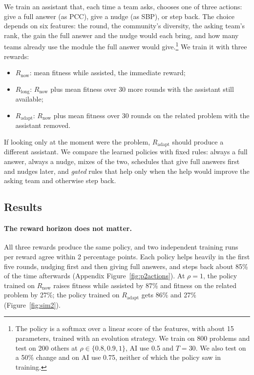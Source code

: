 \documentclass[11pt]{article}
\begin{document}
We train an assistant that, each time a team asks, chooses one of three actions: give a full answer (as PCC), give a nudge (as SBP), or step back. The choice depends on six features: the round, the community's diversity, the asking team's rank, the gain the full answer and the nudge would each bring, and how many teams already use the module the full answer would give.\footnote{The policy is a softmax over a linear score of the features, with about 15 parameters, trained with an evolution strategy. We train on 800 problems and test on 200 others at $\rho \in \{0.8, 0.9, 1\}$, AI use 0.5 and $T=30$. We also test on a 50\% change and on AI use 0.75, neither of which the policy saw in training.} We train it with three rewards:
\begin{itemize}
\item $R_{\text{now}}$: mean fitness while assisted, the immediate reward;
\item $R_{\text{long}}$: $R_{\text{now}}$ plus mean fitness over 30 more rounds with the assistant still available;
\item $R_{\text{adapt}}$: $R_{\text{now}}$ plus mean fitness over 30 rounds on the related problem with the assistant removed.
\end{itemize}
If looking only at the moment were the problem, $R_{\text{adapt}}$ should produce a different assistant. We compare the learned policies with fixed rules: always a full answer, always a nudge, mixes of the two, schedules that give full answers first and nudges later, and \emph{gated} rules that help only when the help would improve the asking team and otherwise step back.

\subsection{Results}

\paragraph{The reward horizon does not matter.} All three rewards produce the same policy, and two independent training runs per reward agree within 2 percentage points. Each policy helps heavily in the first five rounds, nudging first and then giving full answers, and steps back about 85\% of the time afterwards (Appendix Figure~\ref{fig:p2actions}). At $\rho=1$, the policy trained on $R_{\text{now}}$ raises fitness while assisted by 87\% and fitness on the related problem by 27\%; the policy trained on $R_{\text{adapt}}$ gets 86\% and 27\% (Figure~\ref{fig:sim2}).
\end{document}
